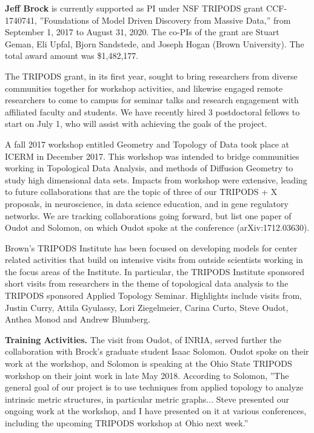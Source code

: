 

\textbf{Jeff Brock} is currently supported as PI under NSF TRIPODS grant CCF-1740741, ''Foundations of Model Driven Discovery from Massive Data,'' from September 1, 2017 to August 31, 2020. The co-PIs of the grant are Stuart Geman, Eli Upfal, Bjorn Sandstede, and Joseph Hogan (Brown University). The total award amount was \$1,482,177.

The TRIPODS grant, in its first year, sought to bring researchers from diverse communities together for workshop activities, and likewise engaged remote researchers to come to campus for seminar talks and research engagement with affiliated faculty and students. We have recently hired 3 postdoctoral fellows to start on July 1, who will assist with achieving the goals of the project.

A fall 2017 workshop entitled Geometry and Topology of Data took place at ICERM in December 2017. This workshop was intended to bridge communities working in Topological Data Analysis, and methods of Diffusion Geometry to study high dimensional data sets. Impacts from workshop were extensive, leading to future collaborations that are the topic of three of our TRIPODS + X proposals, in neuroscience, in data science education, and in gene regulatory networks. We are tracking collaborations going forward, but list one paper of Oudot and Solomon, on which Oudot spoke at the conference (arXiv:1712.03630).

Brown's TRIPODS Institute has been focused on developing models for center related activities that build on intensive visits from outside scientists working in the focus areas of the Institute. In particular, the TRIPODS Institute sponsored short visits from researchers in the theme of topological data analysis to the TRIPODS sponsored Applied Topology Seminar. Highlights include visits from, Justin Curry, Attila Gyulassy, Lori Ziegelmeier, Carina Curto, Steve Oudot, Anthea Monod and Andrew Blumberg.

{\bf Training Activities.}
The visit from Oudot, of INRIA, served further the collaboration with Brock's graduate student Isaac Solomon. Oudot spoke on their work at the workshop, and Solomon is speaking at the Ohio State TRIPODS workshop on their joint work in late May 2018. According to Solomon, ''The general goal of our project is to use techniques from applied topology to analyze intrinsic metric structures, in particular metric graphs... Steve presented our ongoing work at the workshop, and I have presented on it at various conferences, including the upcoming TRIPODS workshop at Ohio next week.''

